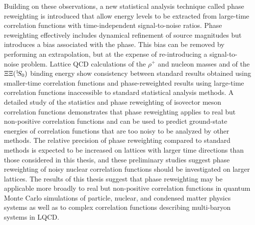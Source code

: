 \documentclass [11pt, proquest] {uwthesis}[2017/05/05]
\def\si{^1 \hskip -0.03in S _0}
\begin{document}
{  Building on these observations, a
  new statistical analysis technique called phase reweighting is introduced
  that allow energy levels to be extracted from large-time correlation functions with time-independent signal-to-noise ratios.
  Phase reweighting effectively includes dynamical refinement of source magnitudes
  but introduces a bias
  associated with the phase.
  This bias can be removed
  by performing 
  an extrapolation,
  but at the expense of
  re-introducing a signal-to-noise problem.
  Lattice QCD calculations 
  of the $\rho^+$ and nucleon masses and of the $\Xi\Xi(\si)$ binding energy
  show consistency between standard results obtained using smaller-time correlation functions and
  phase-reweighted results using large-time correlation functions inaccessible to standard statistical analysis methods.
  A detailed study of the statistics and phase reweighting of isovector meson correlation functions demonstrates that phase reweighting applies to real but non-positive correlation functions and can be used to predict ground-state energies of correlation functions that are too noisy to be analyzed by other methods. 
  The relative precision of phase reweighting compared to standard methods is expected to be increased on 
  lattices with larger time directions than those considered in this thesis, 
  and these preliminary studies suggest phase reweighting of noisy nuclear correlation functions 
  should be investigated on larger lattices. 
  The results of this thesis suggest 
  that phase reweighting may be applicable more broadly to real but non-positive correlation functions in quantum Monte Carlo simulations of particle, nuclear, and condensed matter physics systems as well as to complex correlation functions describing multi-baryon systems in LQCD.
}

 
%
%
\tableofcontents
 
%
%
% 
 
%
\end{document}

